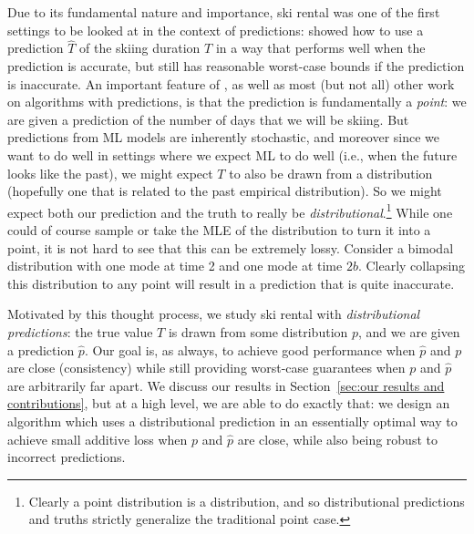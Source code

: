 Due to its fundamental nature and importance, ski rental was one of the first settings to be looked at in the context of predictions: \citet{kumar2024improvingonlinealgorithmsml} showed how to use a prediction $\hat T$ of the skiing duration $T$ in a way that performs well when the prediction is accurate, but still has reasonable worst-case bounds if the prediction is inaccurate.
An important feature of \citet{kumar2024improvingonlinealgorithmsml}, as well as most (but not all) other work on algorithms with predictions, is that the prediction is fundamentally a \emph{point}: we are given a prediction of the number of days that we will be skiing.  But predictions from ML models are inherently stochastic, and moreover since we want to do well in settings where we expect ML to do well (i.e., when the future looks like the past), we might expect $T$ to also be drawn from a distribution (hopefully one that is related to the past empirical distribution).  So we might expect both our prediction and the truth to really be \emph{distributional}.\footnote{Clearly a point distribution is a distribution, and so distributional predictions and truths strictly generalize the traditional point case.} While one could of course sample or take the MLE of the distribution to turn it into a point, it is not hard to see that this can be extremely lossy.  Consider a bimodal distribution with one mode at time 2 and one mode at time $2b$.  Clearly collapsing this distribution to any point will result in a prediction that is quite inaccurate. 

Motivated by this thought process, we study ski rental with \emph{distributional predictions}: the true value $T$ is drawn from some distribution $p$, and we are given a prediction $\hat p$.  Our goal is, as always, to achieve good performance when $\hat p$ and $p$ are close (consistency) while still providing worst-case guarantees when $p$ and $\hat p$ are arbitrarily far apart.  We discuss our results in Section~\ref{sec:our results and contributions}, but at a high level, we are able to do exactly that: we design an algorithm which uses a distributional prediction in an essentially optimal way to achieve small additive loss when $p$ and $\hat p$ are close, while also being robust to incorrect predictions. 

